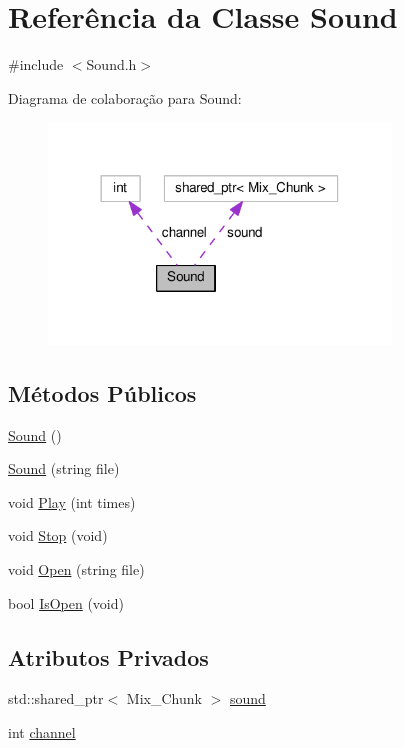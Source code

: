 \hypertarget{classSound}{\section{Referência da Classe Sound}
\label{classSound}
}


{\ttfamily \#include $<$Sound.\+h$>$}



Diagrama de colaboração para Sound\+:
\nopagebreak
\begin{figure}[H]
\begin{center}
\leavevmode
\includegraphics[width=258pt]{classSound__coll__graph}
\end{center}
\end{figure}
\subsection*{Métodos Públicos}
\begin{DoxyCompactItemize}
\item 
\hyperlink{classSound_a539c205cdf06fe2c621fd77c37bcfac9}{Sound} ()
\item 
\hyperlink{classSound_af2c277cdc12b7df1de53e5b855e4f09c}{Sound} (string file)
\item 
void \hyperlink{classSound_a2719199f31d8abfc0bd9a6814e4e169d}{Play} (int times)
\item 
void \hyperlink{classSound_ae391c15fe26a0091e601be32eef0bce5}{Stop} (void)
\item 
void \hyperlink{classSound_afa261d68708b917bf60d704238b56f87}{Open} (string file)
\item 
bool \hyperlink{classSound_a9e67e48d34d9ca3d31f0da846ada923b}{Is\+Open} (void)
\end{DoxyCompactItemize}
\subsection*{Atributos Privados}
\begin{DoxyCompactItemize}
\item 
std\+::shared\+\_\+ptr$<$ Mix\+\_\+\+Chunk $>$ \hyperlink{classSound_a44bbda770ac76c7455b60d3d63b663a7}{sound}
\item 
int \hyperlink{classSound_af3895edf5a39772f1de32cfbfff90909}{channel}
\end{DoxyCompactItemize}


